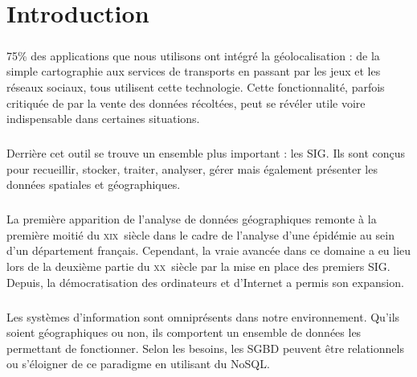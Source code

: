 \chapter*{Introduction}
\label{chap:introduction}
\vspace{5mm}
\paragraph{}75\% des applications que nous utilisons ont intégré la géolocalisation \supercite{statGeolocalisation} : de la simple cartographie aux services de transports en passant par les jeux et les réseaux sociaux, tous utilisent cette technologie. Cette fonctionnalité, parfois critiquée de par la vente des données récoltées, peut se révéler utile voire indispensable dans certaines situations. 

\paragraph{}Derrière cet outil se trouve un ensemble plus important : les \gls{SIG}. Ils sont conçus pour recueillir, stocker, traiter, analyser, gérer mais également présenter les données spatiales et géographiques.

\paragraph{}La première apparition de l'analyse de données géographiques remonte à la première moitié du \textsc{xix}\ieme ~siècle dans le cadre de l'analyse d'une épidémie au sein d'un département français. Cependant, la vraie avancée dans ce domaine a eu lieu lors de la deuxième partie du \textsc{xx}\ieme ~siècle par la mise en place des premiers SIG. Depuis, la démocratisation des ordinateurs et d'Internet a permis son expansion.

\paragraph{}Les systèmes d'information sont omniprésents dans notre environnement. Qu'ils soient géographiques ou non, ils comportent un ensemble de données les permettant de fonctionner. Selon les besoins, les  \gls{SGBD} peuvent être relationnels ou s'éloigner de ce paradigme en utilisant du NoSQL.

